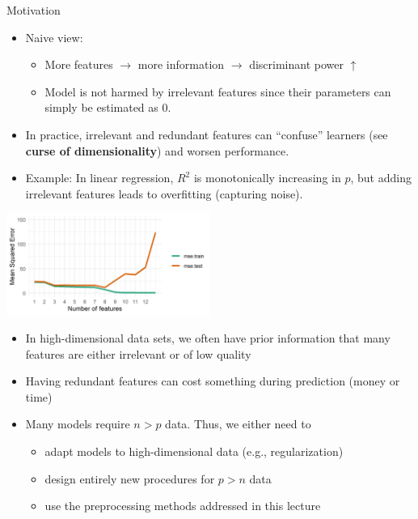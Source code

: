 \documentclass[11pt,compress,t,notes=noshow, xcolor=table]{beamer}
\begin{document}
  \begin{vbframe}{Motivation}
    \begin{itemize}
    \setlength{\itemsep}{0.8em}
      \item Naive view:
        \begin{itemize}
          \item More features $\rightarrow$ more information $\rightarrow$ discriminant power $\uparrow$
          \item Model is not harmed by irrelevant features since their parameters can simply be estimated as 0.
        \end{itemize}
     \item In practice, irrelevant and redundant features can \enquote{confuse} learners (see \textbf{curse of dimensionality}) and worsen performance.
     \item Example: In linear regression, $R^2$ is monotonically increasing in $p$, but adding irrelevant features leads to overfitting (capturing noise). %
  \end{itemize}

  \begin{center}
     \includegraphics[width = 0.5\textwidth]{figure/avoid_overfitting_02.png}\\
    \end{center}

  \framebreak

    \begin{itemize}
    \setlength{\itemsep}{1.0em}
      \item In high-dimensional data sets, we often have prior information that many features are either irrelevant %
      or of low quality
      \item Having redundant features can cost something during prediction %
      (money or time)
      \item Many models require $n > p$ data. Thus, we either need to
      \begin{itemize}
        \item adapt models to high-dimensional data (e.g., regularization)
        \item design entirely new procedures for $p>n$ data
        \item use the preprocessing methods addressed in this lecture
      \end{itemize}
    \end{itemize}
  \end{vbframe}
\end{document}

